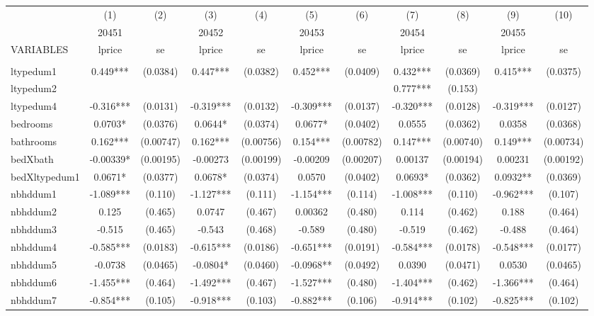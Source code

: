 \documentclass[]{article}
\begin{document}
\begin{tabular}{lcccccccccc} \hline
 & (1) & (2) & (3) & (4) & (5) & (6) & (7) & (8) & (9) & (10) \\
 & 20451 &  & 20452 &  & 20453 &  & 20454 &  & 20455 &  \\
VARIABLES & lprice & se & lprice & se & lprice & se & lprice & se & lprice & se \\ \hline
 &  &  &  &  &  &  &  &  &  &  \\
ltypedum1 & 0.449*** & (0.0384) & 0.447*** & (0.0382) & 0.452*** & (0.0409) & 0.432*** & (0.0369) & 0.415*** & (0.0375) \\
ltypedum2 &  &  &  &  &  &  & 0.777*** & (0.153) &  &  \\
ltypedum4 & -0.316*** & (0.0131) & -0.319*** & (0.0132) & -0.309*** & (0.0137) & -0.320*** & (0.0128) & -0.319*** & (0.0127) \\
bedrooms & 0.0703* & (0.0376) & 0.0644* & (0.0374) & 0.0677* & (0.0402) & 0.0555 & (0.0362) & 0.0358 & (0.0368) \\
bathrooms & 0.162*** & (0.00747) & 0.162*** & (0.00756) & 0.154*** & (0.00782) & 0.147*** & (0.00740) & 0.149*** & (0.00734) \\
bedXbath & -0.00339* & (0.00195) & -0.00273 & (0.00199) & -0.00209 & (0.00207) & 0.00137 & (0.00194) & 0.00231 & (0.00192) \\
bedXltypedum1 & 0.0671* & (0.0377) & 0.0678* & (0.0374) & 0.0570 & (0.0402) & 0.0693* & (0.0362) & 0.0932** & (0.0369) \\
nbhddum1 & -1.089*** & (0.110) & -1.127*** & (0.111) & -1.154*** & (0.114) & -1.008*** & (0.110) & -0.962*** & (0.107) \\
nbhddum2 & 0.125 & (0.465) & 0.0747 & (0.467) & 0.00362 & (0.480) & 0.114 & (0.462) & 0.188 & (0.464) \\
nbhddum3 & -0.515 & (0.465) & -0.543 & (0.468) & -0.589 & (0.480) & -0.519 & (0.462) & -0.488 & (0.464) \\
nbhddum4 & -0.585*** & (0.0183) & -0.615*** & (0.0186) & -0.651*** & (0.0191) & -0.584*** & (0.0178) & -0.548*** & (0.0177) \\
nbhddum5 & -0.0738 & (0.0465) & -0.0804* & (0.0460) & -0.0968** & (0.0492) & 0.0390 & (0.0471) & 0.0530 & (0.0465) \\
nbhddum6 & -1.455*** & (0.464) & -1.492*** & (0.467) & -1.527*** & (0.480) & -1.404*** & (0.462) & -1.366*** & (0.464) \\
nbhddum7 & -0.854*** & (0.105) & -0.918*** & (0.103) & -0.882*** & (0.106) & -0.914*** & (0.102) & -0.825*** & (0.102) \\

\end{tabular}
\end{document}
